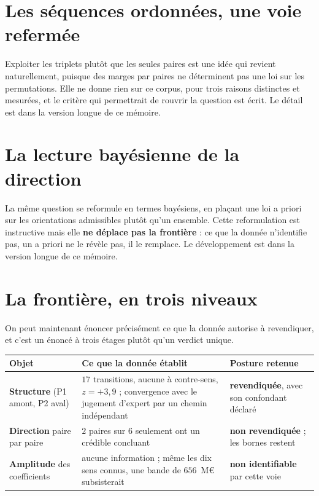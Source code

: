 \section{Les séquences ordonnées, une voie refermée}
\label{sec:sequences-ordonnees}
Exploiter les triplets plutôt que les seules paires est une idée qui revient
naturellement, puisque des marges par paires ne déterminent pas une loi sur les
permutations. Elle ne donne rien sur ce corpus, pour trois raisons distinctes et
mesurées, et le critère qui permettrait de rouvrir la question est écrit. Le détail est
dans la version longue de ce mémoire.

\section{La lecture bayésienne de la direction}
\label{sec:bayes}
La même question se reformule en termes bayésiens, en plaçant une loi a priori sur les
orientations admissibles plutôt qu'un ensemble. Cette reformulation est instructive mais
elle \textbf{ne déplace pas la frontière} : ce que la donnée n'identifie pas, un a priori
ne le révèle pas, il le remplace. Le développement est dans la version longue de ce mémoire.

\section{La frontière, en trois niveaux}

On peut maintenant énoncer précisément ce que la donnée autorise à revendiquer, et c'est un
énoncé à trois étages plutôt qu'un verdict unique.

\begin{center}\small
\renewcommand{\arraystretch}{1.3}
\begin{tabular}{@{}p{3.2cm} p{7.4cm} p{4.2cm}@{}}
\toprule
\textbf{Objet} & \textbf{Ce que la donnée établit} & \textbf{Posture retenue} \\
\midrule
\textbf{Structure} \newline (P1 amont, P2 aval) &
$17$ transitions, aucune à contre-sens, $z=+3{,}9$ ; convergence avec le jugement d'expert par un
chemin indépendant &
\textbf{revendiquée}, avec son confondant déclaré \\
\textbf{Direction} \newline paire par paire &
$2$ paires sur $6$ seulement ont un crédible concluant &
\textbf{non revendiquée} ; les bornes restent \\
\textbf{Amplitude} \newline des coefficients &
aucune information ; même les dix sens connus, une bande de $656$~M\euro{} subsisterait &
\textbf{non identifiable} par cette voie \\
\bottomrule
\end{tabular}
\end{center}

